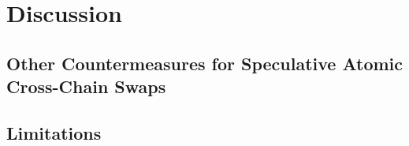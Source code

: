 \section{Discussion}
\label{sec:discussion}

\subsection{Other Countermeasures for Speculative Atomic Cross-Chain Swaps}

\subsection{Limitations}